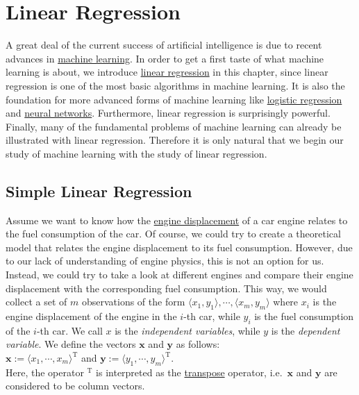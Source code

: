 \chapter{Linear Regression}
A great deal of the current success of artificial intelligence is due to recent advances in
\href{https://en.wikipedia.org/wiki/Machine_learning}{machine learning}.  
In order to get a first taste of what machine learning is about, we introduce 
\href{https://en.wikipedia.org/wiki/Linear_regression}{linear regression} in this chapter, since linear regression
is one of the most basic algorithms in machine learning.  It is also the foundation for more advanced
forms of machine learning like \href{https://en.wikipedia.org/wiki/Logistic_regression}{logistic regression} and 
\href{https://en.wikipedia.org/wiki/Artificial_neural_network}{neural networks}.
Furthermore, linear regression is surprisingly powerful.  Finally, many of the fundamental problems of machine
learning can already be illustrated with linear regression.  Therefore it is only natural that we begin our
study of machine learning with the study of linear regression.

\section{Simple Linear Regression}
Assume we want to know how the \href{https://en.wikipedia.org/wiki/Engine_displacement}{engine displacement} of
a car engine relates to the fuel consumption of the car.  Of course, we could try to create a theoretical model that
relates the engine displacement to its fuel consumption.  However, due to our lack of understanding of engine
physics, this is not an option for us.  Instead, we could try to take a look at different engines and compare
their engine displacement with the corresponding fuel consumption.  This way, we would collect a set of  
$m$ observations of the form $\langle x_1, y_1\rangle, \cdots, \langle x_m, y_m\rangle$ 
where $x_i$ is the engine displacement of the engine in the $i$-th car, while $y_i$ is the fuel consumption of the
$i$-th car.  We call $x$ is the \emph{\color{blue}independent variables}, while $y$ is the 
\emph{\color{blue}dependent variable}.  We define the vectors $\mathbf{x}$ and $\mathbf{y}$ as follows:
\\[0.2cm]
\hspace*{1.3cm}
$\mathbf{x} := \langle x_1, \cdots, x_m \rangle^{\mathrm{T}}$ \quad and \quad
$\mathbf{y} := \langle y_1, \cdots, y_m \rangle^{\mathrm{T}}$.
\\[0.2cm]
Here, the operator $^\mathrm{T}$ is interpreted as the \href{https://en.wikipedia.org/wiki/Transpose}{transpose} operator,
i.e.~$\mathbf{x}$ and $\mathbf{y}$ are considered to be column vectors.


